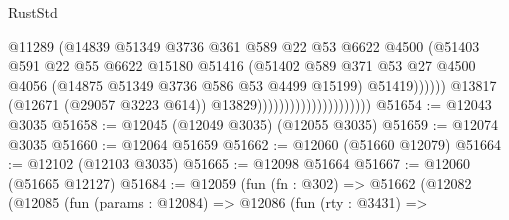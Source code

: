 \begin{lexlean}{RustStd}
\begin{coremodule}
                                                    @11289
                                                    (@14839
                                                      @51349
                                                      @3736
                                                      @361
                                                      @589
                                                      @22
                                                      @53
                                                      @6622
                                                      @4500
                                                      (@51403
                                                        @591
                                                        @22
                                                        @55
                                                        @6622
                                                        @15180
                                                        @51416
                                                        (@51402
                                                          @589
                                                          @371
                                                          @53
                                                          @27
                                                          @4500
                                                          @4056
                                                          (@14875
                                                            @51349
                                                            @3736
                                                            @586
                                                            @53
                                                            @4499
                                                            @15199)
                                                          @51419))))))
                                              @13817
                                              (@12671 (@29057 @3223 @614))
                                              @13829)))))))))))))))))))))
@51654 := @12043 @3035
@51658 := @12045 (@12049 @3035) (@12055 @3035)
@51659 := @12074 @3035
@51660 := @12064 @51659
@51662 := @12060 (@51660 @12079)
@51664 := @12102 (@12103 @3035)
@51665 := @12098 @51664
@51667 := @12060 (@51665 @12127)
@51684 := @12059
    (fun (fn : @302) =>
    @51662
      (@12082
        (@12085
          (fun (params : @12084) =>
          @12086
            (fun (rty : @3431) =>

\end{coremodule}
\end{lexlean}
